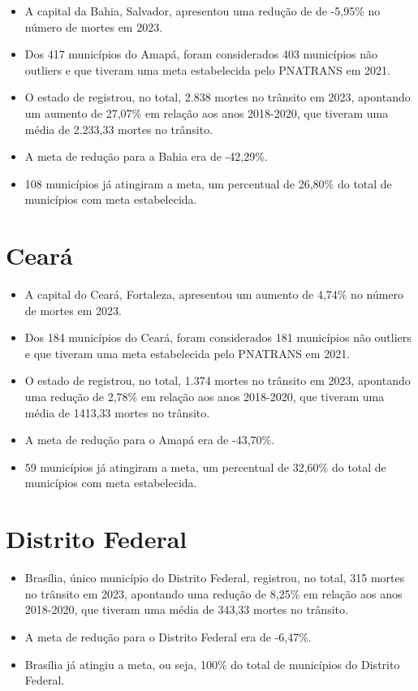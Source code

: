 \documentclass[
  letterpaper,
  DIV=11,
  numbers=noendperiod]{scrreprt}
\begin{document}
\begin{itemize}
\item
  A capital da Bahia, Salvador, apresentou uma redução de de -5,95\% no
  número de mortes em 2023.
\item
  Dos 417 municípios do Amapá, foram considerados 403 municípios não
  outliers e que tiveram uma meta estabelecida pelo PNATRANS em 2021.
\item
  O estado de registrou, no total, 2.838 mortes no trânsito em 2023,
  apontando um aumento de 27,07\% em relação aos anos 2018-2020, que
  tiveram uma média de 2.233,33 mortes no trânsito.
\item
  A meta de redução para a Bahia era de -42,29\%.
\item
  108 municípios já atingiram a meta, um percentual de 26,80\% do total
  de municípios com meta estabelecida.
\end{itemize}

\section{Ceará}\label{cearuxe1}

\begin{itemize}
\item
  A capital do Ceará, Fortaleza, apresentou um aumento de 4,74\% no
  número de mortes em 2023.
\item
  Dos 184 municípios do Ceará, foram considerados 181 municípios não
  outliers e que tiveram uma meta estabelecida pelo PNATRANS em 2021.
\item
  O estado de registrou, no total, 1.374 mortes no trânsito em 2023,
  apontando uma redução de 2,78\% em relação aos anos 2018-2020, que
  tiveram uma média de 1413,33 mortes no trânsito.
\item
  A meta de redução para o Amapá era de -43,70\%.
\item
  59 municípios já atingiram a meta, um percentual de 32,60\% do total
  de municípios com meta estabelecida.
\end{itemize}

\section{Distrito Federal}\label{distrito-federal}

\begin{itemize}
\item
  Brasília, único município do Distrito Federal, registrou, no total,
  315 mortes no trânsito em 2023, apontando uma redução de 8,25\% em
  relação aos anos 2018-2020, que tiveram uma média de 343,33 mortes no
  trânsito.
\item
  A meta de redução para o Distrito Federal era de -6,47\%.
\item
  Brasília já atingiu a meta, ou seja, 100\% do total de municípios do
  Distrito Federal.
\end{itemize}
\end{document}

